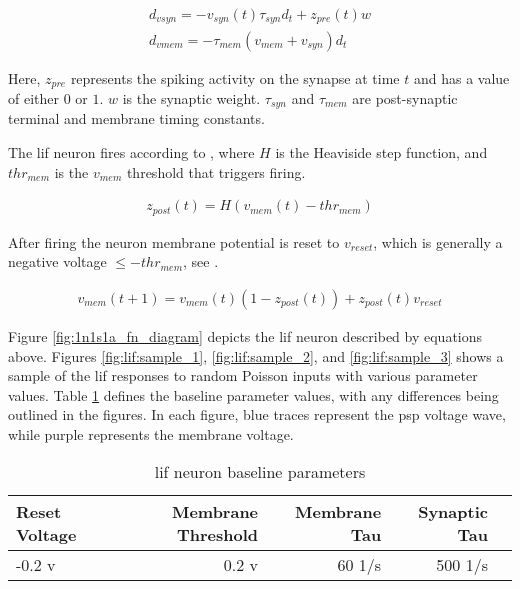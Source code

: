 \begin{align}
d_{vsyn} = -v_{syn}(t) \tau_{syn} d_t + z_{pre}(t) w \label{eq:lif:psp} \\
d_{vmem} = -\tau_{mem} (v_{mem} + v_{syn}) d_t \label{eq:lif:v}
\end{align}

Here, $z_{pre}$ represents the spiking activity on the synapse at time $t$ and
has a value of either $0$ or $1$. $w$ is the synaptic weight. $\tau_{syn}$ and
$\tau_{mem}$ are post-synaptic terminal and membrane timing constants.

The \gls{lif} neuron fires according to , where $H$ is the
Heaviside step function, and $thr_{mem}$ is the $v_{mem}$ threshold that
triggers firing.

\begin{align}
z_{post}(t) = H(v_{mem}(t) - thr_{mem}) \label{eq:lif:fire}
\end{align}

After firing the neuron membrane potential is reset to $v_{reset}$, which is
generally a negative voltage $\leq -thr_{mem}$, see .

\begin{align}
v_{mem}(t+1) = v_{mem}(t)(1 - z_{post}(t)) + z_{post}(t)v_{reset} \label{eq:lif:reset}
\end{align}

Figure \ref{fig:1n1s1a_fn_diagram} depicts the \gls{lif} neuron described by
equations above. Figures \ref{fig:lif:sample_1}, \ref{fig:lif:sample_2}, and
\ref{fig:lif:sample_3} shows a sample of the \gls{lif} responses to random
Poisson inputs with various parameter values. Table \ref{table:lif_params}
defines the baseline parameter values, with any differences being outlined in
the figures. In each figure, blue traces represent the \gls{psp} voltage wave,
while purple represents the membrane voltage.

\begin{table}[!htp]\centering
  \caption{\Gls{lif} neuron baseline parameters} \label{table:lif_params}
  \scriptsize
  \begin{tabular}{lrrrr}\toprule
    Reset Voltage &Membrane Threshold &Membrane Tau &Synaptic Tau \\\midrule
    -0.2 v &0.2 v &60 1/s &500 1/s \\
    \bottomrule
  \end{tabular}
\end{table}



